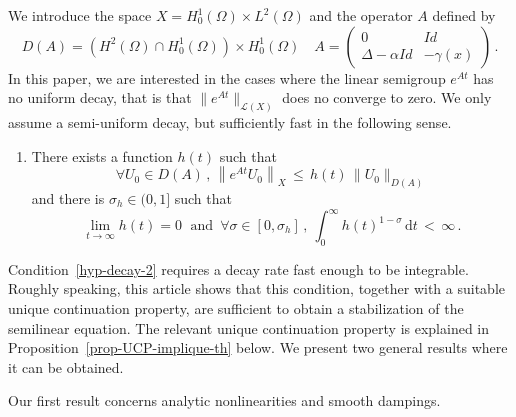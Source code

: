 \documentclass[11pt]{article}
\theoremstyle{definition}
\numberwithin{equation}{section}
\numberwithin{figure}{section}
\numberwithin{table}{section}
\newcommand{\Lc}{\mathcal{L}}
\newcommand{\drm}{\mathrm{d}}
\newcommand*{\romanenumi}{\renewcommand*{\theenumi}{\roman{enumi}}}
\let\oldforall\forall
\renewcommand*{\forall}{\mathrel{\oldforall}}
\begin{document}
We introduce the space $X=H^1_0(\Omega)\times L^2(\Omega)$ and the operator $A$ defined by
\[
D(A)=\left(H^2(\Omega)\cap H^1_0(\Omega)\right)\times H^1_0(\Omega)\quad
A =
\begin{pmatrix}
0 & Id \\
\Delta-\alpha Id & -\gamma(x)
\end{pmatrix}\,.
\]
In this paper, we are interested in the cases where the linear semigroup $e^{At}$ has no uniform decay, that is that $\|e^{At}\|_{\Lc(X)}$ does no converge to zero. We only assume a semi-uniform decay, but sufficiently fast in the following sense.

\begingroup
\begin{enumerate}\romanenumi
\setcounter{enumi}{4}
\item \label{listintro1.5}There exists a function $h(t)$ such that
\begin{equation}\label{hyp-decay-1}
\forall U_0\in D(A)\,,\,\left\|e^{At}U_0\right\|_X \, \leq \, h(t)\,\|U_0\|_{D(A)}
\end{equation}
and there is $\sigma_h\in(0,1]$ such that
\begin{equation}\label{hyp-decay-2}
\lim_{t\rightarrow \infty}h(t)=0\;\text{ and }\,
\forall \sigma\in[0,\sigma_h]\,,\:\int_0^\infty h(t)^{1-\sigma}\,\drm t\,<\,\infty\,.
\end{equation}
\end{enumerate}
\endgroup
Condition~\eqref{hyp-decay-2} requires a decay rate fast enough to be integrable. Roughly speaking, this article shows that this condition, together with a suitable unique continuation property, are sufficient to obtain a stabilization of the semilinear equation. The relevant unique continuation property is explained in Proposition~\ref{prop-UCP-implique-th} below. We present two general results where it can be obtained.

Our first result concerns analytic nonlinearities and smooth dampings.
\end{document}
